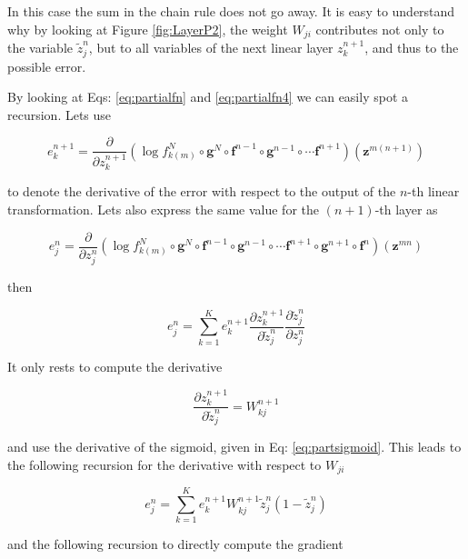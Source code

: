 In this case the sum in the chain rule does not go away. It is easy to understand why by looking at Figure \ref{fig:LayerP2}, the weight $W_{ji}$ contributes not only to the variable $\tilde{z}^n_j$, but to all variables of the next linear layer $z^{n+1}_k$, and thus to the possible error. 

By looking at Eqs: \ref{eq:partialfn} and \ref{eq:partialfn4} we can easily spot a recursion. Lets use

\begin{equation}
e^{n+1}_k = \frac{\partial}{\partial z^{n+1}_{k}} (\log f_{k(m)}^N \circ \mathbf{g}^N \circ \mathbf{f}^{n-1} \circ \mathbf{g}^{n-1} \circ \cdots \mathbf{f}^{n+1})(\mathbf{z}^{m(n+1)})
\end{equation}

\noindent to denote the derivative of the error with respect to the output of the $n$-th linear transformation. Lets also express the same value for the $(n+1)$-th layer as   

\begin{equation}
e^{n}_j = \frac{\partial}{\partial z^{n}_{j}} (\log f_{k(m)}^N \circ \mathbf{g}^N \circ \mathbf{f}^{n-1} \circ \mathbf{g}^{n-1} \circ \cdots \mathbf{f}^{n+1} \circ \mathbf{g}^{n+1} \circ \mathbf{f}^{n})(\mathbf{z}^{mn}) 
\end{equation}

\noindent then

\begin{equation}
e^{n}_j = \sum_{k=1}^K e^{n+1}_k \frac{\partial z^{n+1}_k}{\partial \tilde{z}_{j}^n}\frac{\partial \tilde{z}^n_{j}}{\partial z_{j}^n} 
\end{equation}

\noindent It only rests to compute the derivative

\begin{equation}
\frac{\partial z^{n+1}_k}{\partial \tilde{z}_{j}^n} = W_{kj}^{n+1} 
\end{equation}

\noindent and use the derivative of the sigmoid, given in Eq: \ref{eq:partsigmoid}. This leads to the following recursion for the derivative with respect to $W_{ji}$

\begin{equation}
e^{n}_j = \sum_{k=1}^K e^{n+1}_k W_{kj}^{n+1}\tilde{z}^n_{j}(1-\tilde{z}^n_{j})
\end{equation}

\noindent and the following recursion to directly compute the gradient

